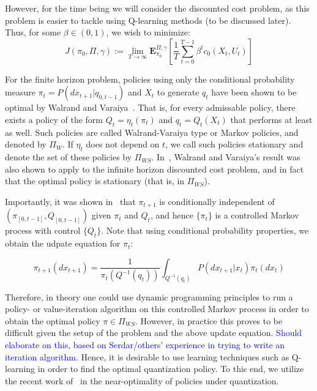 \documentclass{article}
\begin{document}
However, for the time being we will consider the discounted cost problem, as this problem is easier to tackle using Q-learning methods (to be discussed later). Thus, for some \( \beta \in (0,1) \), we wish to minimize:
\[ J(\pi_0, \Pi, \gamma) := \lim_{T\to\infty}\mathbf{E}_{\pi_0}^{\Pi, \gamma}\left[\frac{1}{T}\sum_{t=0}^{T-1}\beta^t c_0(X_t,U_t)\right] \]

For the finite horizon problem, policies using only the conditional probability measure \( \pi_t = P(dx_{t+1}|q_{0,t-1}) \) and \( X_t \) to generate \( q_t \) have been shown to be optimal by Walrand and Varaiya~\cite{Walrand}. That is, for every admissable policy, there exists a policy of the form \( Q_t = \eta_t(\pi_t) \) and \( q_t = Q_t(X_t) \) that performs at least as well. Such policies are called Walrand-Varaiya type or Markov policies, and denoted by \( \Pi_{W} \). If \( \eta_t \) does not depend on \( t \), we call such policies stationary and denote the set of these policies by \( \Pi_{WS} \). In~\cite{Wood}, Walrand and Varaiya's result was also shown to apply to the infinite horizon discounted cost problem, and in fact that the optimal policy is stationary (that is, in \( \Pi_{WS} \)).

Importantly, it was shown in~\cite{Wood} that \( \pi_{t+1} \) is conditionally independent of \( (\pi_{[0,t-1]}, Q_{[0,t-1]}) \) given \( \pi_t \) and \( Q_t \), and hence \( \{\pi_t\} \) is a controlled Markov process with control \( \{Q_t\} \). Note that using conditional probability properties, we obtain the udpate equation for \( \pi_t \):

\begin{equation}
    \pi_{t+1}(dx_{t+1}) = \frac{1}{\pi_t(Q^{-1}(q_t))}\int_{Q^{-1}(q_t)}P(dx_{t+1}|x_t)\pi_t(dx_t)\label{eq:1}
\end{equation}

Therefore, in theory one could use dynamic programming principles to run a policy- or value-iteration algorithm on this controlled Markov process in order to obtain the optimal policy \( \pi \in \Pi_{WS} \). However, in practice this proves to be difficult given the setup of the problem and the above update equation. \textcolor{blue}{Should elaborate on this, based on Serdar/others' experience in trying to write an iteration algorithm.} Hence, it is desirable to use learning techniques such as Q-learning in order to find the optimal quantization policy. To this end, we utilize the recent work of~\cite{Kara} in the near-optimality of policies under quantization.
\end{document}
